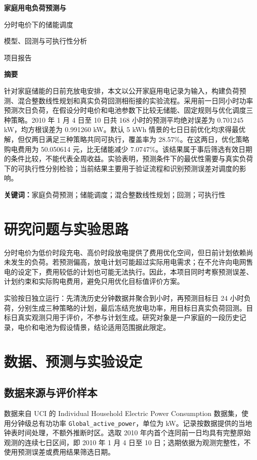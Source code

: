 \documentclass[fontset=windows,12pt,a4paper]{ctexart}
\begin{document}
\begin{center}
{\LARGE\heiti\bfseries 家庭用电负荷预测与\par 分时电价下的储能调度}\par
\vspace{0.5em}
{\large 模型、回测与可执行性分析}\par
\vspace{0.4em}
{\small 项目报告}
\end{center}
\begin{center}{\heiti\bfseries 摘\quad 要}\end{center}
针对家庭储能的日前充放电安排，本文以公开家庭用电记录为输入，构建负荷预测、混合整数线性规划和真实负荷回测相衔接的实验流程。采用前一日同小时功率预测次日负荷，在假设分时电价和电池参数下比较无储能、固定规则与优化调度三种策略。2010 年 1 月 4 日至 10 日共 168 小时的预测平均绝对误差为 0.701245 kW，均方根误差为 0.991260 kW。默认 5 kWh 情景的七日日前优化均求得最优解，但仅两日满足三种策略共同可执行，覆盖率为 28.57\%。在这两日，优化策略购电费用为 50.050614 元，比无储能减少 7.0747\%。该结果属于事后筛选有效日期的条件比较，不能代表全周收益。实验表明，预测条件下的最优性需要与真实负荷下的可执行性分别检验；当前结果主要用于验证流程和识别预测误差对调度的影响。

\vspace{0.5em}
\noindent\textbf{关键词：}家庭负荷预测；储能调度；混合整数线性规划；回测；可执行性

\section{研究问题与实验思路}
分时电价为低价时段充电、高价时段放电提供了费用优化空间，但日前计划依赖尚未发生的负荷。若预测偏高，放电计划可能超过实际用电需求；在不允许向电网售电的设定下，费用较低的计划也可能无法执行。因此，本项目同时考察预测误差、计划约束和实际购电费用，避免只用优化目标值评价方案。

实验按日独立运行：先清洗历史分钟数据并聚合到小时，再预测目标日 24 小时负荷，分别生成三种策略的计划，最后冻结充放电功率，用目标日真实负荷回测。目标日真实观测只用于评价，不参与计划生成。研究对象是一户家庭的一段历史记录，电价和电池为假设情景，结论适用范围据此限定。

\section{数据、预测与实验设定}
\subsection{数据来源与评价样本}
数据来自 UCI 的 Individual Household Electric Power Consumption 数据集\cite{uci}，使用分钟级总有功功率 \texttt{Global\_active\_power}，单位为 kW。记录按数据提供的当地钟表时间处理，不额外推断时区。选取 2010 年内首个连同前一日均具有完整原始观测的连续七日区间，即 2010 年 1 月 4 日至 10 日；选期依据为观测完整性，不使用预测误差或费用结果筛选日期。
\end{document}
